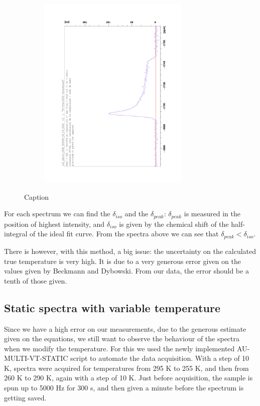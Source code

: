 \documentclass[12pt]{article}
\begin{document}
\begin{figure}[!ht]
\begin{subfigure}[b]{0.3\textwidth}
    \end{subfigure}
    \begin{subfigure}[b]{0.3\textwidth}
        \includegraphics[width=0.8\textwidth,angle=-90]{207Pb/207Pb_295K.pdf}
    \end{subfigure}
    \caption{Caption}
    \label{fig:my_label}
\end{figure}

For each spectrum we can find the $\delta_{iso}$ and the $\delta_{peak}$: $\delta_{peak}$ is measured in the position of highest intensity, and $\delta_{iso}$ is given by the chemical shift of the half-integral of the ideal fit curve. From the spectra above we can see that $\delta_{peak} < \delta_{iso}$.

There is however, with this method, a big issue: the uncertainty on the calculated true temperature is very high. It is due to a very generous error given on the values given by Beckmann and Dybowski. From our data, the error should be a tenth of those given.

\subsection{Static spectra with variable temperature}

Since we have a high error on our measurements, due to the generous estimate given on the equations, we still want to observe the behaviour of the spectra when we modify the temperature. For this we used the newly implemented AU-MULTI-VT-STATIC script to automate the data acquisition. With a step of 10 K, spectra were acquired for temperatures from 295 K to 255 K, and then from 260 K to 290 K, again with a step of 10 K. Just before acquisition, the sample is spun up to 5000 Hz for 300 s, and then given a minute before the spectrum is getting saved.
\end{document}
